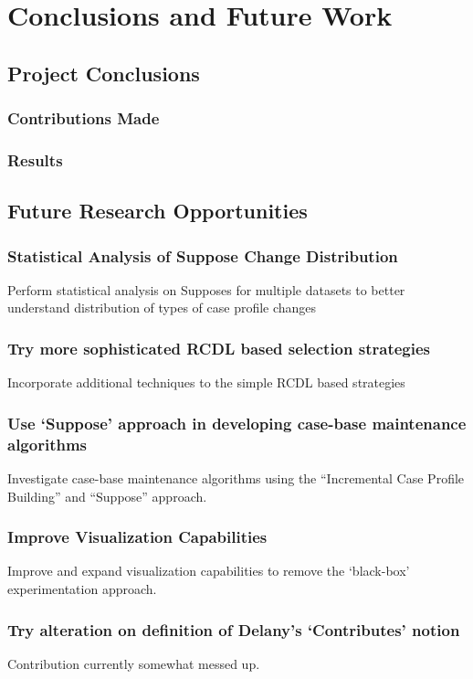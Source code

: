 \documentclass[a4paper,11pt]{report}
\begin{document}
\chapter{Conclusions and Future Work\label{cha:conclusions}}

\section{Project Conclusions}
\subsection{Contributions Made}

\subsection{Results}

\section{Future Research Opportunities}
\subsection{Statistical Analysis of Suppose Change Distribution}
Perform statistical analysis on Supposes for multiple datasets to better understand distribution of types of case profile changes

\subsection{Try more sophisticated RCDL based selection strategies}
Incorporate additional techniques to the simple RCDL based strategies

\subsection{Use `Suppose' approach in developing case-base maintenance algorithms}
Investigate case-base maintenance algorithms using the ``Incremental Case Profile Building'' and ``Suppose'' approach.

\subsection{Improve Visualization Capabilities}
Improve and expand visualization capabilities to remove the `black-box' experimentation approach.

\subsection{Try alteration on definition of Delany's `Contributes' notion}
Contribution currently somewhat messed up.
\end{document}
